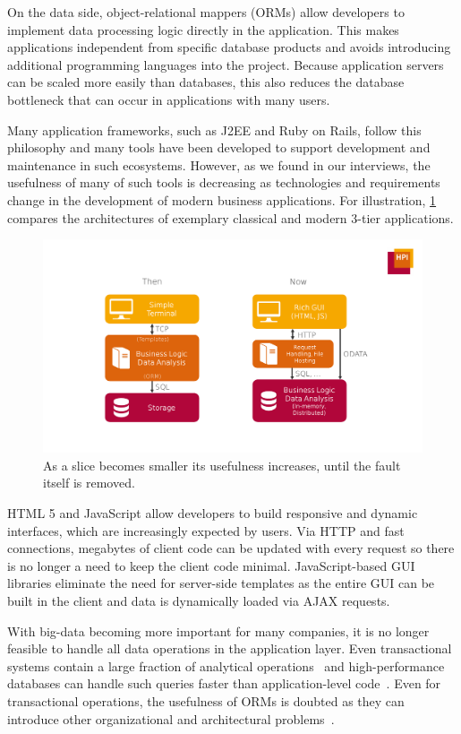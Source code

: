 On the data side, object-relational mappers (ORMs) allow developers to implement data processing logic directly in the application.
This makes applications independent from specific database products and avoids introducing additional programming languages into the project.
Because application servers can be scaled more easily than databases, this also reduces the database bottleneck that can occur in applications with many users.

Many application frameworks, such as J2EE and Ruby on Rails, follow this philosophy and many tools have been developed to support development and maintenance in such ecosystems.
However, as we found in our interviews, the usefulness of many of such tools is decreasing as technologies and requirements change in the development of modern business applications.
For illustration, \cref{fig:3tier-changes} compares the architectures of exemplary classical and modern 3-tier applications.

\begin{figure}[t]
\centering
\includegraphics[width=.9\linewidth]{img/3tier-changes}
\caption{As a slice becomes smaller its usefulness increases, until the fault itself is removed.}
\label{fig:3tier-changes}
\end{figure}

HTML 5 and JavaScript allow developers to build responsive and dynamic interfaces, which are increasingly expected by users.
Via HTTP and fast connections, megabytes of client code can be updated with every request so there is no longer a need to keep the client code minimal.
JavaScript-based GUI libraries eliminate the need for server-side templates as the entire GUI can be built in the client and data is dynamically loaded via AJAX requests.

With big-data becoming more important for many companies, it is no longer feasible to handle all data operations in the application layer.
Even transactional systems contain a large fraction of analytical operations~\cite{krueger10:a_case_for_online} and high-performance databases can handle such queries faster than application-level code~\cite{plattner09:a_common_database_approach}.
Even for transactional operations, the usefulness of ORMs is doubted as they can introduce other organizational and architectural problems~\cite{neward06:the_vietnam_of_computer}.

